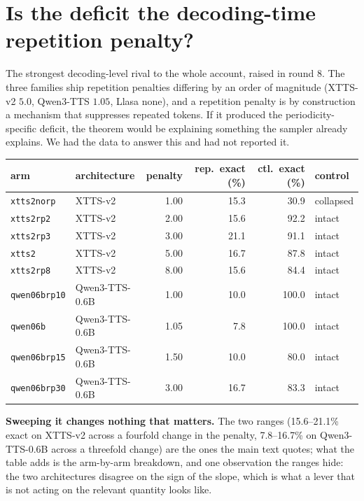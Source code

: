 \documentclass[11pt]{article}
\begin{document}
\section{Is the deficit the decoding-time repetition penalty?}
\label{sec:s15}

The strongest decoding-level rival to the whole account, raised in round 8. The
three families ship repetition penalties differing by an order of magnitude
(XTTS-v2 $5.0$, Qwen3-TTS $1.05$, Llasa none), and a repetition penalty is by
construction a mechanism that suppresses repeated tokens. If it produced the
periodicity-specific deficit, the theorem would be explaining something the
sampler already explains. We had the data to answer this and had not reported it.

\begin{center}
\begin{tabular}{llrrrl}
\toprule
arm & architecture & penalty & rep.\ exact (\%) & ctl.\ exact (\%) & control \\
\midrule
\texttt{xtts2norp} & XTTS-v2 & 1.00 & 15.3 & 30.9 & collapsed \\
\texttt{xtts2rp2} & XTTS-v2 & 2.00 & 15.6 & 92.2 & intact \\
\texttt{xtts2rp3} & XTTS-v2 & 3.00 & 21.1 & 91.1 & intact \\
\texttt{xtts2} & XTTS-v2 & 5.00 & 16.7 & 87.8 & intact \\
\texttt{xtts2rp8} & XTTS-v2 & 8.00 & 15.6 & 84.4 & intact \\
\texttt{qwen06brp10} & Qwen3-TTS-0.6B & 1.00 & 10.0 & 100.0 & intact \\
\texttt{qwen06b} & Qwen3-TTS-0.6B & 1.05 & 7.8 & 100.0 & intact \\
\texttt{qwen06brp15} & Qwen3-TTS-0.6B & 1.50 & 10.0 & 80.0 & intact \\
\texttt{qwen06brp30} & Qwen3-TTS-0.6B & 3.00 & 16.7 & 83.3 & intact \\
\bottomrule
\end{tabular}
\end{center}

\noindent\textbf{Sweeping it changes nothing that matters.} The two ranges
(15.6--21.1\% exact on XTTS-v2 across a fourfold change in the penalty,
7.8--16.7\% on Qwen3-TTS-0.6B across a threefold change) are the ones the main
text quotes; what the table adds is the arm-by-arm breakdown, and one
observation the ranges hide: the two architectures disagree on the sign of the
slope, which is what a lever that is not acting on the relevant quantity looks
like.
\end{document}
